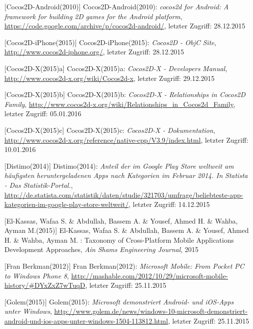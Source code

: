 \begin{thebibliography}{}
[Cocos2D-Android(2010)] Cocos2D-Android(2010): \emph{cocos2d for Android: A framework for building 2D games for the Android platform},
\url{https://code.google.com/archive/p/cocos2d-android/}, letzter Zugriff: 28.12.2015

[Cocos2D-iPhone(2015)] Cocos2D-iPhone(2015): \emph{Cocos2D - ObjC Site},
\url{http://www.cocos2d-iphone.org/}, letzter Zugriff: 28.12.2015

[Cocos2D-X(2015)a] Cocos2D-X(2015)a: \emph{Cocos2D-X - Developers Manual},
\url{http://www.cocos2d-x.org/wiki/Cocos2d-x}, letzter Zugriff: 29.12.2015

[Cocos2D-X(2015)b] Cocos2D-X(2015)b: \emph{Cocos2D-X - Relationships in Cocos2D Family},
\url{http://www.cocos2d-x.org/wiki/Relationships_in_Cocos2d_Family}, letzter Zugriff: 05.01.2016

[Cocos2D-X(2015)c] Cocos2D-X(2015)c: \emph{Cocos2D-X - Dokumentation},
\url{http://www.cocos2d-x.org/reference/native-cpp/V3.9/index.html}, letzter Zugriff: 10.01.2016

[Distimo(2014)] Distimo(2014): \emph{Anteil der im Google Play Store weltweit am häufigsten heruntergeladenen Apps nach Kategorien im Februar 2014. In Statista - Das Statistik-Portal.},
\url{http://de.statista.com/statistik/daten/studie/321703/umfrage/beliebteste-app-kategorien-im-google-play-store-weltweit/}, letzter Zugriff: 14.12.2015

[El-Kassas, Wafaa S. \& Abdullah, Bassem A. \&  Yousef, Ahmed H. \&  Wahba, Ayman M.(2015)] El-Kassas, Wafaa S. \& Abdullah, Bassem A. \&  Yousef, Ahmed H. \&  Wahba, Ayman M. :
\glqq Taxonomy of Cross-Platform Mobile Applications Development Approaches\grqq, 
\emph{Ain Shams Engineering Journal}, 2015

[Fran Berkman(2012)] Fran Berkman(2012): \emph{Microsoft Mobile: From Pocket PC to Windows Phone 8},
\url{http://mashable.com/2012/10/29/microsoft-mobile-history/#DYxZxZ7wTuqD}, letzter Zugriff: 25.11.2015

[Golem(2015)] Golem(2015): \emph{Microsoft demonstriert Android- und iOS-Apps unter Windows},
\url{http://www.golem.de/news/windows-10-microsoft-demonstriert-android-und-ios-apps-unter-windows-1504-113812.html}, letzter Zugriff: 25.11.2015


\end{thebibliography}
